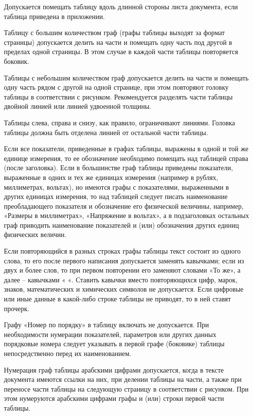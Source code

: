 Допускается помещать таблицу вдоль длинной стороны листа документа, если таблица
приведена в приложении.

Таблицу с большим количеством граф (графы таблицы выходят за формат страницы)
допускается делить на части и помещать одну часть под другой в пределах одной страницы. В
этом случае в каждой части таблицы повторяется боковик.

Таблицы с небольшим количеством граф допускается делить на части и помещать одну
часть рядом с другой на одной странице, при этом повторяют головку таблицы в соответствии с
рисунком. Рекомендуется разделять части таблицы двойной линией или линией удвоенной
толщины.

Таблицы слева, справа и снизу, как правило, ограничивают линиями. Головка таблицы
должна быть отделена линией от остальной части таблицы.

Если все показатели, приведенные в графах таблицы, выражены в одной и той же
единице измерения, то ее обозначение необходимо помещать над таблицей справа (после
заголовка). Если в большинстве граф таблицы приведены показатели, выраженные в одних и тех
же единицах измерения (например в рублях, миллиметрах, вольтах), но имеются графы с
показателями, выраженными в других единицах измерения, то над таблицей следует писать
наименование преобладающего показателя и обозначение его физической величины, например,
«Размеры в миллиметрах», «Напряжение в вольтах», а в подзаголовках остальных граф
приводить наименование показателей и (или) обозначения других единиц физических величин.

Если повторяющийся в разных строках графы таблицы текст состоит из одного слова, то
его после первого написания допускается заменять кавычками; если из двух и более слов, то
при первом повторении его заменяют словами «То же», а далее – кавычками
« «. Ставить кавычки вместо повторяющихся цифр, марок, знаков, математических и химических символов
не допускается. Если цифровые или иные данные в какой-либо строке таблицы не приводят, то в
ней ставят прочерк.

Графу «Номер по порядку» в таблицу включать не допускается. При необходимости
нумерации показателей, параметров или других данных порядковые номера следует указывать в
первой графе (боковике) таблицы непосредственно перед их наименованием.

Нумерация граф таблицы арабскими цифрами допускается, когда в тексте документа
имеются ссылки на них, при делении таблицы на части, а также при переносе части таблицы на
следующую страницу в соответствии с рисунком. При этом нумеруются арабскими цифрами
графы и (или) строки первой части таблицы.

